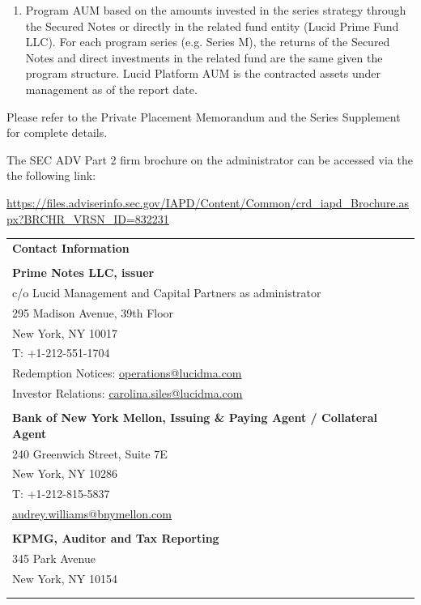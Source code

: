 \documentclass[9pt]{article}
\begin{document}
\begin{enumerate}
\item Program AUM based on the amounts invested in the series strategy through the Secured Notes or directly in the related fund entity (Lucid Prime Fund LLC).  For each program series (e.g. Series M), the returns of the Secured Notes and direct investments in the related fund are the same given the program structure. Lucid Platform AUM is the contracted assets under management as of the report date.

\end{enumerate}

\noindent Please refer to the Private Placement Memorandum and the Series Supplement for complete details. 

{\color{gray} \noindent The SEC ADV Part 2 firm brochure on the administrator can be accessed via the the following link:

\noindent\underline{https://files.adviserinfo.sec.gov/IAPD/Content/Common/crd\_iapd\_Brochure.aspx?BRCHR\_VRSN\_ID=832231}}

\begin{center}\noindent\begin{tabular}{p{\textwidth}}
\rowcolor{lucid_blue} 
{\color[HTML]{FFFFFF} \textbf{Contact Information}} \\
\rowcolor[HTML]{EFEFEF} 
 \\
\rowcolor[HTML]{EFEFEF} 
\textbf{Prime Notes LLC, issuer} \\
\rowcolor[HTML]{EFEFEF} 
 c/o Lucid Management and Capital Partners as administrator\\
\rowcolor[HTML]{EFEFEF} 
 295 Madison Avenue, 39th Floor\\
\rowcolor[HTML]{EFEFEF} 
 New York, NY 10017\\
\rowcolor[HTML]{EFEFEF} 
 T: +1-212-551-1704\\
\rowcolor[HTML]{EFEFEF} 
 Redemption Notices: \underline{operations@lucidma.com}\\
\rowcolor[HTML]{EFEFEF} 
 Investor Relations: \underline{carolina.siles@lucidma.com}\\
\rowcolor[HTML]{EFEFEF} 
 \\
\rowcolor[HTML]{EFEFEF} 
\textbf{Bank of New York Mellon, Issuing \& Paying Agent / Collateral Agent} \\
\rowcolor[HTML]{EFEFEF} 
 240 Greenwich Street, Suite 7E\\
\rowcolor[HTML]{EFEFEF} 
 New York, NY 10286\\
\rowcolor[HTML]{EFEFEF} 
 T: +1-212-815-5837\\
\rowcolor[HTML]{EFEFEF} 
 \underline{audrey.williams@bnymellon.com}\\
\rowcolor[HTML]{EFEFEF} 
 \\
\rowcolor[HTML]{EFEFEF} 
 \textbf{KPMG, Auditor and Tax Reporting}\\
\rowcolor[HTML]{EFEFEF} 
 345 Park Avenue\\
\rowcolor[HTML]{EFEFEF} 
 New York, NY 10154\\
\rowcolor[HTML]{EFEFEF} 
 \\
\rowcolor[HTML]{EFEFEF} 

\end{tabular}
\end{center}
\end{document}
